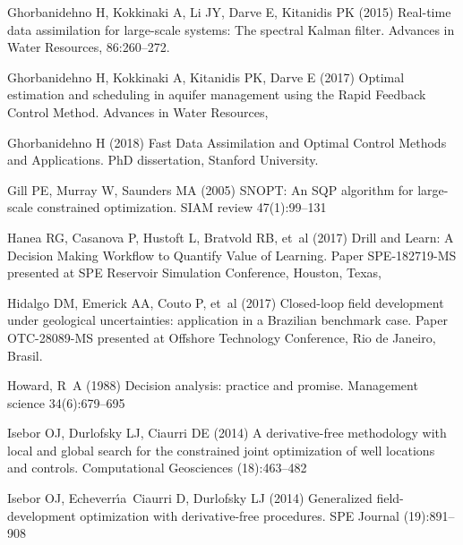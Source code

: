 \documentclass[11pt]{article}
\begin{document}
\begin{thebibliography}{51}
Ghorbanidehno H, Kokkinaki A, Li JY, Darve E, Kitanidis PK (2015) Real-time
  data assimilation for large-scale systems: The spectral Kalman filter.
Advances in Water Resources, 86:260--272.

Ghorbanidehno H, Kokkinaki A, Kitanidis PK, Darve E (2017) Optimal estimation and scheduling in aquifer management using the Rapid Feedback Control Method.
Advances in Water Resources,


Ghorbanidehno H (2018) Fast Data Assimilation and Optimal Control Methods and Applications. 
PhD dissertation, Stanford University.

Gill PE, Murray W, Saunders MA (2005) SNOPT: An SQP algorithm for large-scale
  constrained optimization. SIAM review 47(1):99--131


Hanea RG, Casanova P, Hustoft L, Bratvold RB, et~al (2017)
Drill and Learn: A Decision Making Workflow to Quantify Value of Learning.
Paper SPE-182719-MS presented at SPE Reservoir Simulation Conference, Houston, Texas,

Hidalgo DM, Emerick AA, Couto P, et~al (2017)
Closed-loop field development under geological uncertainties: application in a Brazilian benchmark case.
Paper OTC-28089-MS presented at Offshore Technology Conference, Rio de Janeiro, Brasil.

Howard, R~A (1988) Decision analysis: practice and promise.
Management science 34(6):679--695

Isebor OJ, Durlofsky LJ, Ciaurri DE (2014{}) A derivative-free
  methodology with local and global search for the constrained joint
  optimization of well locations and controls. Computational Geosciences
  (18):463--482

Isebor OJ, Echeverr{\'\i}a~Ciaurri D, Durlofsky LJ (2014{})
  Generalized field-development optimization with derivative-free procedures.
  SPE Journal (19):891--908


\end{thebibliography}
\end{document}

